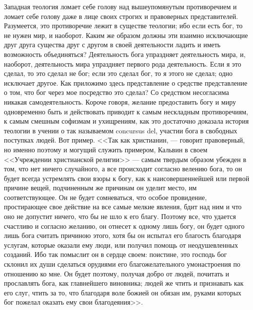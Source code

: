 \documentclass[12pt]{article}
\begin{document}
Западная теология ломает себе голову над вышеупомянутым противоречием и ломает себе голову даже в лице своих строгих и правоверных представителей. Разумеется, это противоречие лежит в существе теологии; ибо если есть бог, то не нужен мир, и наоборот. Каким же образом должны эти взаимно исключающие друг друга существа друг с другом в своей деятельности ладить и иметь возможность объединяться? Деятельность бога упраздняет деятельность мира, и, наоборот, деятельность мира упраздняет первого рода деятельность. Если я это сделал, то это сделал не бог; если это сделал бог, то я этого не сделал; одно исключает другое. Как приложимо здесь представление о средстве представление о том, что бог через мое посредство это сделал? Со средством несогласима никакая самодеятельность. Короче говоря, желание предоставить богу и миру одновременно быть и действовать приводит к самым нескладным противоречиям, к самым смешным софизмам и ухищрениям, как это достаточно доказала история теологии в учении о так называемом concursus del, участии бога в свободных поступках людей. Вот пример. <<Так как христианин, --- говорит правоверный, но именно поэтому и могущий служить примером, Кальвин в своем <<Учреждении христианской религии>>  --- самым твердым образом убежден в том, что нет ничего случайного, а все происходит согласно велению бога, то он будет всегда устремлять свои взоры к богу, как к наисовершеннейшей или первой причине вещей, подчиненным же причинам он уделит место, им соответствующее. Он не будет сомневаться, что особое провидение, простирающее свое действие на все самые мелкие явления, бдит над ним и что оно не допустит ничего, что бы не шло к его благу. Поэтому все, что удается счастливо и согласно желанию, он отнесет к одному лишь богу, он будет одного лишь бога считать причиною этого, хотя бы он испытал его благость благодаря услугам, которые оказали ему люди, или получил помощь от неодушевленных созданий. Ибо так помыслит он в сердце своем: поистине, это господь бог склонил их души сделаться орудиями его благожелательного умонастроения по отношению ко мне. Он будет поэтому, получая добро от людей, почитать и прославлять бога, как главнейшего виновника; людей же чтить и признавать как его слуг, чтить за то, что благодаря воле божией он обязан им, руками которых бог пожелал оказать ему свои благодеяния>>. 
\end{document}

